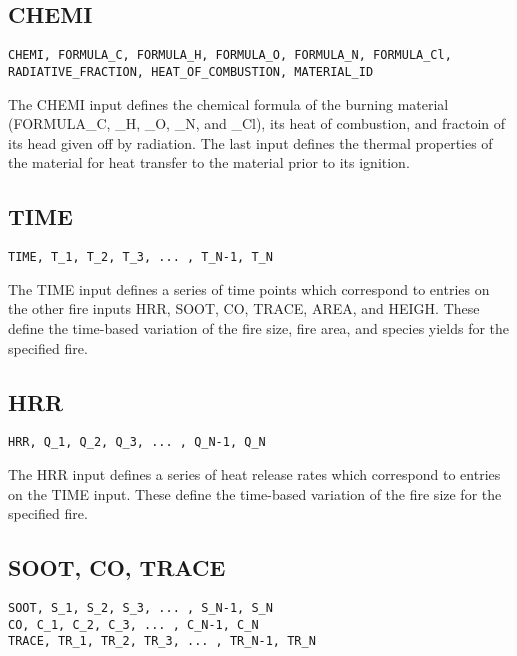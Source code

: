 \subsection{CHEMI}

\begin{lstlisting}
CHEMI, FORMULA_C, FORMULA_H, FORMULA_O, FORMULA_N, FORMULA_Cl,  RADIATIVE_FRACTION, HEAT_OF_COMBUSTION, MATERIAL_ID
\end{lstlisting}

The CHEMI input defines the chemical formula of the burning material (FORMULA\_C, \_H, \_O, \_N, and \_Cl), its heat of combustion, and fractoin of its head given off by radiation. The last input defines the thermal properties of the material for heat transfer to the material prior to its ignition.

\subsection{TIME}

\begin{lstlisting}
TIME, T_1, T_2, T_3, ... , T_N-1, T_N
\end{lstlisting}

The TIME input defines a series of time points which correspond to entries on the other fire inputs HRR, SOOT, CO, TRACE, AREA, and HEIGH.  These define the time-based variation of the fire size, fire area, and species yields for the specified fire.

\subsection{HRR}

\begin{lstlisting}
HRR, Q_1, Q_2, Q_3, ... , Q_N-1, Q_N
\end{lstlisting}

The HRR input defines a series of heat release rates which correspond to entries on the TIME input.  These define the time-based variation of the fire size for the specified fire.

\subsection{SOOT, CO, TRACE}

\begin{lstlisting}
SOOT, S_1, S_2, S_3, ... , S_N-1, S_N
CO, C_1, C_2, C_3, ... , C_N-1, C_N
TRACE, TR_1, TR_2, TR_3, ... , TR_N-1, TR_N
\end{lstlisting}

